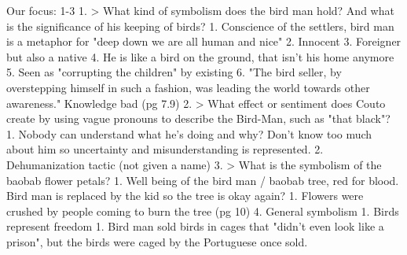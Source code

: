 \documentclass[letterpaper]{article}
\begin{document}
Our focus: 1-3 1. > What kind of symbolism does the bird man hold? And
what is the significance of his keeping of birds? 1. Conscience of the
settlers, bird man is a metaphor for "deep down we are all human and
nice" 2. Innocent 3. Foreigner but also a native 4. He is like a bird on
the ground, that isn't his home anymore 5. Seen as "corrupting the
children" by existing 6. "The bird seller, by overstepping himself in
such a fashion, was leading the world towards other awareness."
Knowledge bad (pg 7.9) 2. > What effect or sentiment does Couto create
by using vague pronouns to describe the Bird-Man, such as "that
black"? 1. Nobody can understand what he's doing and why? Don't know too
much about him so uncertainty and misunderstanding is represented. 2.
Dehumanization tactic (not given a name) 3. > What is the symbolism of
the baobab flower petals? 1. Well being of the bird man / baobab tree,
red for blood. Bird man is replaced by the kid so the tree is okay
again? 1. Flowers were crushed by people coming to burn the tree
(pg 10) 4. General symbolism 1. Birds represent freedom 1. Bird man sold
birds in cages that "didn't even look like a prison", but the birds were
caged by the Portuguese once sold.
\end{document}
